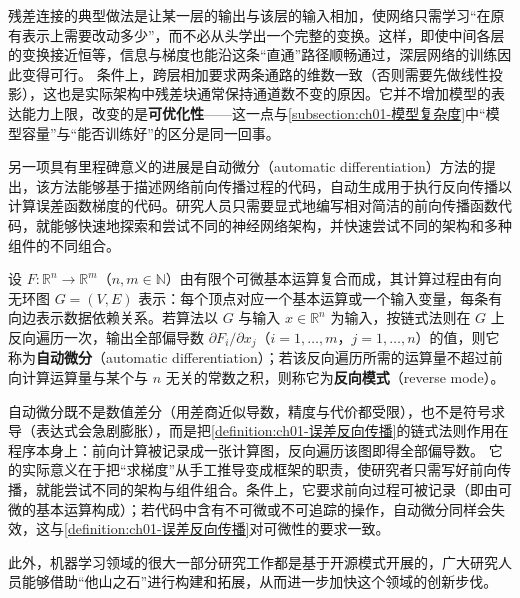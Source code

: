 \documentclass[../../main.tex]{subfiles}
\begin{document}
\begin{remark}
残差连接的典型做法是让某一层的输出与该层的输入相加，使网络只需学习“在原有表示上需要改动多少”，而不必从头学出一个完整的变换。这样，即使中间各层的变换接近恒等，信息与梯度也能沿这条“直通”路径顺畅通过，深层网络的训练因此变得可行。
条件上，跨层相加要求两条通路的维数一致（否则需要先做线性投影），这也是实际架构中残差块通常保持通道数不变的原因。它并不增加模型的表达能力上限，改变的是\textbf{可优化性}——这一点与\cref{subsection:ch01-模型复杂度}中“模型容量”与“能否训练好”的区分是同一回事。
\end{remark}

另一项具有里程碑意义的进展是自动微分（automatic differentiation）方法的提出，该方法能够基于描述网络前向传播过程的代码，自动生成用于执行反向传播以计算误差函数梯度的代码。研究人员只需要显式地编写相对简洁的前向传播函数代码，就能够快速地探索和尝试不同的神经网络架构，并快速尝试不同的架构和多种组件的不同组合。

\begin{definition}[自动微分]\label{definition:ch01-自动微分}
设 $F:\mathbb{R}^{n}\to\mathbb{R}^{m}$（$n,m\in\mathbb{N}$）由有限个可微基本运算复合而成，其计算过程由有向无环图 $G=(V,E)$ 表示：每个顶点对应一个基本运算或一个输入变量，每条有向边表示数据依赖关系。若算法以 $G$ 与输入 $x\in\mathbb{R}^{n}$ 为输入，按链式法则在 $G$ 上反向遍历一次，输出全部偏导数 $\partial F_{i}/\partial x_{j}$（$i=1,\dots,m$，$j=1,\dots,n$）的值，则它称为\textbf{自动微分}（automatic differentiation）；若该反向遍历所需的运算量不超过前向计算运算量与某个与 $n$ 无关的常数之积，则称它为\textbf{反向模式}（reverse mode）。
\end{definition}

\begin{remark}
自动微分既不是数值差分（用差商近似导数，精度与代价都受限），也不是符号求导（表达式会急剧膨胀），而是把\cref{definition:ch01-误差反向传播}的链式法则作用在程序本身上：前向计算被记录成一张计算图，反向遍历该图即得全部偏导数。
它的实际意义在于把“求梯度”从手工推导变成框架的职责，使研究者只需写好前向传播，就能尝试不同的架构与组件组合。条件上，它要求前向过程可被记录（即由可微的基本运算构成）；若代码中含有不可微或不可追踪的操作，自动微分同样会失效，这与\cref{definition:ch01-误差反向传播}对可微性的要求一致。
\end{remark}

此外，机器学习领域的很大一部分研究工作都是基于开源模式开展的，广大研究人员能够借助“他山之石”进行构建和拓展，从而进一步加快这个领域的创新步伐。
\end{document}
